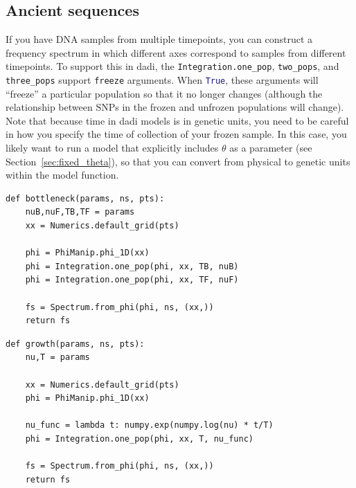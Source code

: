 \documentclass[12pt]{article}
\makeatletter
\newcommand{\dadi}{dadi\xspace}
\newcommand{\py}[1]{\lstinline[language=Python, showstringspaces=False]@#1@}
\makeatother
\begin{document}
\subsection{Ancient sequences}\label{sec:ancient_sequences}

If you have DNA samples from multiple timepoints, you can construct a frequency spectrum in which different axes correspond to samples from different timepoints.
To support this in \dadi, the \py{Integration.one_pop}, \py{two_pops}, and \py{three_pops} support \py{freeze} arguments.
When \py{True}, these arguments will ``freeze'' a particular population so that it no longer changes (although the relationship between SNPs in the frozen and unfrozen populations will change).
Note that because time in \dadi models is in genetic units, you need to be careful in how you specify the time of collection of your frozen sample.
In this case, you likely want to run a model that explicitly includes $\theta$ as a parameter (see Section~\ref{sec:fixed_theta}), so that you can convert from physical to genetic units within the model function.

\clearpage

\begin{lstlisting}[caption={\textbf{Bottleneck:} At time \py{TF} + \py{TB} in the past, an equilibrium population goes through a bottleneck of depth \py{nuB}, recovering to relative size \py{nuF}.}, float, label={lst:bottleneck}]
def bottleneck(params, ns, pts):
    nuB,nuF,TB,TF = params
    xx = Numerics.default_grid(pts)

    phi = PhiManip.phi_1D(xx)
    phi = Integration.one_pop(phi, xx, TB, nuB)
    phi = Integration.one_pop(phi, xx, TF, nuF)

    fs = Spectrum.from_phi(phi, ns, (xx,))
    return fs
\end{lstlisting}

\begin{lstlisting}[caption={\textbf{Exponential growth:} At time \py{T} in the past, an equilibrium population begins growing exponentially, reaching size \py{nu} at present.}, float]
def growth(params, ns, pts):
    nu,T = params

    xx = Numerics.default_grid(pts)
    phi = PhiManip.phi_1D(xx)

    nu_func = lambda t: numpy.exp(numpy.log(nu) * t/T)
    phi = Integration.one_pop(phi, xx, T, nu_func)

    fs = Spectrum.from_phi(phi, ns, (xx,))
    return fs
\end{lstlisting}
\end{document}
